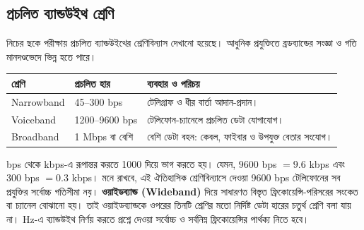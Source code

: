 \subsection{প্রচলিত ব্যান্ডউইথ শ্রেণি}
\label{ch2:c01-10}
নিচের ছকে পরীক্ষায় প্রচলিত ব্যান্ডউইথের শ্রেণিবিন্যাস দেখানো হয়েছে। আধুনিক প্রযুক্তিতে ব্রডব্যান্ডের সংজ্ঞা ও গতি মানদণ্ডভেদে ভিন্ন হতে পারে।
\begin{tabularx}{\linewidth}{|p{.22\linewidth}|p{.25\linewidth}|X|}
\hline
\textbf{শ্রেণি} & \textbf{প্রচলিত হার} & \textbf{ব্যবহার ও পরিচয়}\\\hline
Narrowband & 45--300 bps & টেলিগ্রাফ ও ধীর বার্তা আদান-প্রদান।\\\hline
Voiceband & 1200--9600 bps & টেলিফোন-চ্যানেলে প্রচলিত ডেটা যোগাযোগ।\\\hline
Broadband & 1 Mbps বা বেশি & বেশি ডেটা বহন: কেবল, ফাইবার ও উপযুক্ত বেতার সংযোগ।\\\hline
\end{tabularx}
bps থেকে kbps-এ রূপান্তর করতে 1000 দিয়ে ভাগ করতে হয়। যেমন, $9600$ bps $=9.6$ kbps এবং $300$ bps $=0.3$ kbps। মনে রাখবে, এই ঐতিহাসিক শ্রেণিবিন্যাসে দেওয়া 9600 bps টেলিফোনের সব প্রযুক্তির সর্বোচ্চ গতিসীমা নয়।
\textbf{ওয়াইডব্যান্ড (Wideband)} দিয়ে সাধারণত বিস্তৃত ফ্রিকোয়েন্সি-পরিসরের সংকেত বা চ্যানেল বোঝানো হয়। তাই ওয়াইডব্যান্ডকে ওপরের তিনটি শ্রেণির মতো নির্দিষ্ট ডেটা হারের চতুর্থ শ্রেণি বলা যায় না। Hz-এ ব্যান্ডউইথ নির্ণয় করতে প্রশ্নে দেওয়া সর্বোচ্চ ও সর্বনিম্ন ফ্রিকোয়েন্সির পার্থক্য নিতে হবে।

